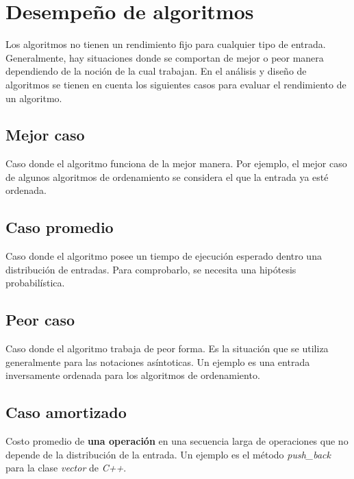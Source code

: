 \section{Desempeño de algoritmos}
Los algoritmos no tienen un rendimiento fijo para cualquier tipo de
entrada. Generalmente, hay situaciones donde se comportan de mejor
o peor manera dependiendo de la noción de la cual trabajan. En el
análisis y diseño de algoritmos se tienen en cuenta los siguientes
casos para evaluar el rendimiento de un algoritmo.

\subsection{Mejor caso}
Caso donde el algoritmo funciona de la mejor manera. Por ejemplo,
el mejor caso de algunos algoritmos de ordenamiento se considera
el que la entrada ya esté ordenada.

\subsection{Caso promedio}
Caso donde el algoritmo posee un tiempo de ejecución esperado
dentro una distribución de entradas. Para comprobarlo, se necesita
una hipótesis probabilística.

\subsection{Peor caso}
Caso donde el algoritmo trabaja de peor forma. Es la situación que
se utiliza generalmente para las notaciones asíntoticas. Un ejemplo
es una entrada inversamente ordenada para los algoritmos de
ordenamiento.

\subsection{Caso amortizado}
Costo promedio de \textbf{una operación} en una secuencia larga de
operaciones que no depende de la distribución de la entrada.
Un ejemplo es el método \textit{push\_back} para la clase \textit{vector}
de \textit{C++}.
